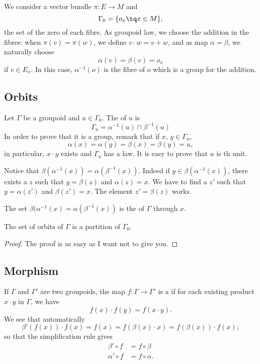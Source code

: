 We consider a vector bundle $\pi\colon E\to M$ and
\[
	\Gamma_0=\{ o_{x}\tq x\in M \},
\]
the set of the zero of each fibre. As groupoid law, we choose the addition in the fibres: when $\pi(v)=\pi(w)$, we define $v\cdot w=v+w$, and as map $\alpha=\beta$, we naturally choose
\[
	\alpha(v)=\beta(v)=o_{x}
\]
if $v\in E_{x}$. In this case, $\alpha^{-1}(o)$ is the fibre of $o$ which is a group for the addition.


\subsection{Orbits}

Let $\Gamma$ be a groupoid and $u\in\Gamma_0$. The  of $u$ is
\[
	\Gamma_{u}=\alpha^{-1}(u)\cap\beta^{-1}(u)
\]
In order to prove that it is a group, remark that if $x$, $y\in\Gamma_{u}$,
\[
	\alpha(x)=\alpha(y)=\beta(x)=\beta(y)=u,
\]
in particular, $x\cdot y$ exists and $\Gamma_{u}$ has a law. It is easy to prove that $u$ is th unit.

Notice that $\beta(\alpha^{-1}(x))=\alpha(\beta^{-1}(x))$. Indeed if $y\in\beta(\alpha^{-1}(x))$, there exists a $z$ such that $y=\beta(z)$ and $\alpha(z)=x$. We have to find a $z'$ such that $y=\alpha(z')$ and $\beta(z')=x$. The element $z'=\beta(z)$ works.

The set $\beta(\alpha^{-1}(x)=\alpha(\beta^{-1}(x))$ is the  of $\Gamma$ through $x$.

\begin{proposition}
	The set of orbits of $\Gamma$ is a partition of $\Gamma_0$.
\end{proposition}

\begin{proof}
	The proof is as easy as I want not to give you.
\end{proof}

\subsection{Morphism}

If $\Gamma$ and $\Gamma'$ are two groupoids, the map $f\colon \Gamma\to \Gamma'$ is a  if for each existing product $x\cdot y$ in $\Gamma$, we have
\[
	f(x)\cdot f(y)=f(x\cdot y).
\]
We see that automatically
\[
	\beta'(f(x))\cdot f(x)=f(x)=f(\beta(x)\cdot x)=f(\beta(x))\cdot f(x);
\]
so that the simplification rule gives
\begin{subequations}
	\begin{align}
		\beta'\circ f  & =f\circ\beta   \\
		\alpha'\circ f & =f\circ\alpha.
	\end{align}
\end{subequations}

